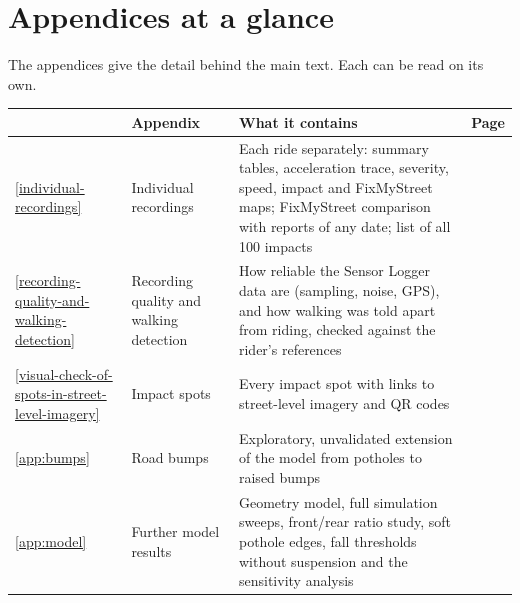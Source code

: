 \section*{Appendices at a glance}

The appendices give the detail behind the main text. Each can be read on its own.

\begin{table}[h]
\centering\small\renewcommand{\arraystretch}{1.35}
\begin{tabular}{@{}l>{\raggedright\arraybackslash}p{38mm}>{\raggedright\arraybackslash}p{82mm}r@{}}
\toprule
 & Appendix & What it contains & Page \\
\midrule
\ref{individual-recordings} & Individual recordings
  & Each ride separately: summary tables, acceleration trace, severity, speed, impact and
    FixMyStreet maps; FixMyStreet comparison with reports of any date; list of all 100 impacts
  & \pageref{individual-recordings} \\
\ref{recording-quality-and-walking-detection} & Recording quality and walking detection
  & How reliable the Sensor Logger data are (sampling, noise, GPS), and how walking was told
    apart from riding, checked against the rider's references
  & \pageref{recording-quality-and-walking-detection} \\
\ref{visual-check-of-spots-in-street-level-imagery} & Impact spots
  & Every impact spot with links to street-level imagery and QR codes
  & \pageref{visual-check-of-spots-in-street-level-imagery} \\
\ref{app:bumps} & Road bumps
  & Exploratory, unvalidated extension of the model from potholes to raised bumps
  & \pageref{app:bumps} \\
\ref{app:model} & Further model results
  & Geometry model, full simulation sweeps, front/rear ratio study, soft pothole edges,
    fall thresholds without suspension and the sensitivity analysis
  & \pageref{app:model} \\
\bottomrule
\end{tabular}
\end{table}
\clearpage
